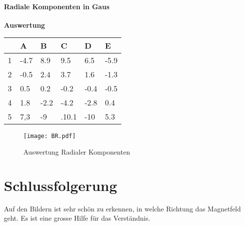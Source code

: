 \documentclass{article}
\begin{document}
\paragraph{Radiale Komponenten in Gaus}\textbf{Auswertung}
\begin{table}[H]
	\centering
	\begin{tabular}{|l|l|l|l|l|l|}
		\hline
		~ & A    & B    & C     & D    & E    \\ \hline
		1 & -4.7 & 8.9  & 9.5   & 6.5  & -5.9 \\ 
		2 & -0.5 & 2.4  & 3.7   & 1.6  & -1.3 \\ 
		3 & 0.5  & 0.2  & -0.2  & -0.4 & -0.5 \\ 
		4 & 1.8  & -2.2 & -4.2  & -2.8 & 0.4  \\ 
		5 & 7,3  & -9   & .10.1 & -10  & 5.3  \\
		\hline
	\end{tabular}
\end{table}
\begin{figure}[H]
	\centering
	\texttt{[image: BR.pdf]} 
	\caption{Auswertung Radialer Komponenten}
\end{figure}
\section{Schlussfolgerung}
Auf den Bildern ist sehr schön zu erkennen, in welche Richtung das Magnetfeld geht. Es ist eine grosse Hilfe für das Verständnis.
\end{document}
